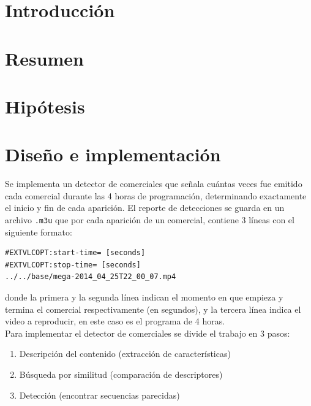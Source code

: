 \documentclass[14pt,letterpaper,hidelinks]{extarticle}
\begin{document}

\renewcommand{\sectionmark}[1]{\markright{\thesection.\ #1}}
\renewcommand{\headrulewidth}{0.5pt}

%
\tableofcontents
\listoffigures
\listoftables

\newpage
\section{Introducción}
\section{Resumen}
\section{Hipótesis}
\section{Diseño e implementación}
Se implementa un detector de comerciales que señala cuántas veces fue emitido cada comercial durante las 4 horas de programación, determinando exactamente el inicio y
fin de cada aparición. El reporte de detecciones se guarda en un archivo \verb+.m3u+ que por cada aparición de un comercial, contiene 3 líneas con el siguiente formato: 
\begin{verbatim}
#EXTVLCOPT:start-time= [seconds]
#EXTVLCOPT:stop-time= [seconds]
../../base/mega-2014_04_25T22_00_07.mp4
\end{verbatim}
donde la primera y la segunda línea indican el momento en que empieza y termina el comercial respectivamente (en segundos), y la tercera línea indica el video a reproducir, en este caso es el programa de 4 horas.\\

Para implementar el detector de comerciales se divide el trabajo en 3 pasos: 
\begin{enumerate}
\item Descripción del contenido (extracción de características)
\item Búsqueda por similitud (comparación de descriptores)
\item Detección (encontrar secuencias parecidas)
\end{enumerate}
\end{document}
